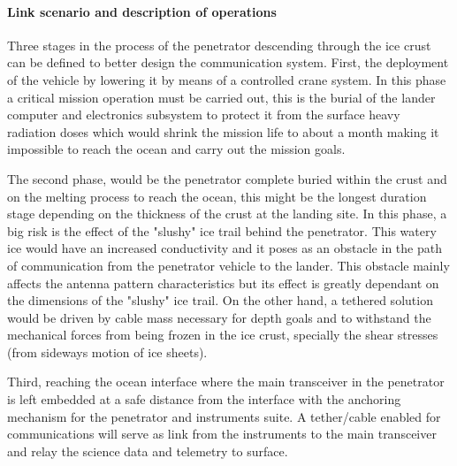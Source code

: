 
\paragraph{Link scenario and description of operations}
Three stages in the process of the penetrator descending through the ice crust can be defined to better design the communication system. First, the deployment of the vehicle by lowering it by means of a controlled crane system. In this phase a critical mission operation must be carried out, this is the burial of the lander computer and electronics subsystem to protect it from the surface heavy radiation doses which would shrink the mission life to about a month making it impossible to reach the ocean and carry out the mission goals.

The second phase, would be the penetrator complete buried within the crust and on the melting process to reach the ocean, this might be the longest duration stage depending on the thickness of the crust at the landing site. In this phase, a big risk is the effect of the "slushy" ice trail behind the penetrator. This watery ice would have an increased conductivity and it poses as an obstacle in the path of communication from the penetrator vehicle to the lander. This obstacle mainly affects the antenna pattern characteristics but its effect is greatly dependant on the dimensions of the "slushy" ice trail. On the other hand, a tethered solution would be driven by cable mass necessary for depth goals and to withstand the mechanical forces from being frozen in the ice crust, specially the shear stresses (from sideways motion of ice sheets).

Third, reaching the ocean interface where the main transceiver in the penetrator is left embedded at a safe distance from the interface with the anchoring mechanism for the penetrator and instruments suite. A tether/cable enabled for communications will serve as link from the instruments to the main transceiver and relay the science data and telemetry to surface.

